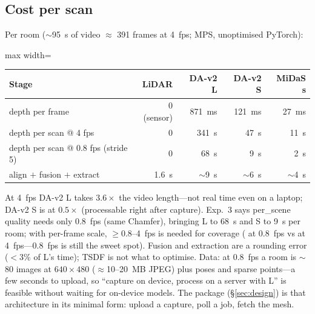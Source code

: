 \subsection{Cost per scan}
Per room ($\sim$\SI{95}{s} of video $\approx$ 391 frames at 4~fps; MPS, unoptimised PyTorch):
\begin{table}[t]
\centering\small
\begin{adjustbox}{max width=\textwidth}
\begin{tabular}{@{}lrrrr@{}}
\toprule
Stage & LiDAR & DA-v2 L & DA-v2 S & MiDaS s \\
\midrule
depth per frame & 0 (sensor) & \SI{871}{ms} & \SI{121}{ms} & \SI{27}{ms} \\
depth per scan @ 4 fps & 0 & \SI{341}{s} & \SI{47}{s} & \SI{11}{s} \\
depth per scan @ 0.8 fps (stride 5) & 0 & \SI{68}{s} & \SI{9}{s} & \SI{2}{s} \\
align $+$ fusion $+$ extract & \SI{1.6}{s} & $\sim$\SI{9}{s} & $\sim$\SI{6}{s} & $\sim$\SI{4}{s} \\
\bottomrule
\end{tabular}
\end{adjustbox}
\end{table}
At 4~fps DA-v2 L takes $3.6\times$ the video length---not real time even on a laptop; DA-v2 S is at $0.5\times$
(processable right after capture). Exp.~3 says per\_scene quality needs only 0.8~fps (same Chamfer), bringing L to
\SI{68}{s} and S to \SI{9}{s} per room; with per-frame scale, $\geq 0.8$--4~fps is needed for coverage (\fscore{} \rsSTRORACLEFIVEF{}
at 0.8~fps vs \rsSTRORACLEONEF{} at 4~fps---0.8~fps is still the sweet spot). Fusion and extraction are a rounding error ($<3\%$ of
L's time); TSDF is not what to optimise. Data: at 0.8~fps a room is $\sim$80 images at $640\times480$
($\approx$10--\SI{20}{MB} JPEG) plus poses and sparse points---a few seconds to upload, so ``capture on device, process
on a server with L'' is feasible without waiting for on-device models. The  package
(\S\ref{sec:design}) is that architecture in its minimal form: upload a capture, poll a job, fetch the mesh.

